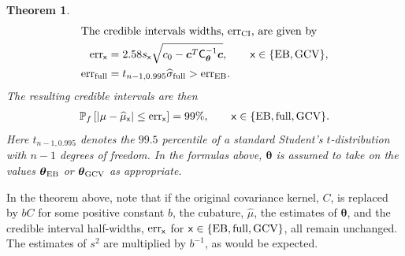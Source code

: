 \documentclass{iitthesis}          %
\newcommand{\bm}[1]{\boldsymbol{#1}}
\newcommand{\vtheta}{{\bm{\theta}}}
\newcommand{\vc}{\bm{c}}
\newcommand{\mCthetaInv}{{\mathsf{C}^{-1}_{\vtheta}}}
\newcommand{\hmu}{\widehat{\mu}}
\newcommand{\hsigma}{\widehat{\sigma}}
\newcommand{\MLE}{\textup{EB}}
\newcommand{\full}{\textup{full}}
\newcommand{\GCV}{\textup{GCV}}
\newcommand{\NICE}{\textup{nice}}
\newcommand{\err}{\textup{err}}
\newcommand{\JRNote}[1]{}
\newtheorem{theorem}{Theorem}[section]
\begin{document}
\begin{theorem}
\begin{align}
	\intertext{The credible intervals widths, $\err_{\textup{CI}}$, are given by}
	\label{eqn:err_MLEGCV}
	\err_{\mathsf{x}} & = 2.58 s_{\mathsf{x}} \sqrt{c_{0} - \vc^T\mCthetaInv\vc }, \qquad \mathsf{x} \in \{\MLE, \GCV\},  \\ 
	\err_{\textup{full}} 
	& = t_{n-1,0.995} \hsigma_{\textup{full}} > \err_\MLE. \label{FJH:eq:errFull}
	\end{align}
	The resulting credible intervals are then
	\begin{align}
	\label{eqn_prob_CI}
	\mathbb{P}_f \left[
	|\mu-\hmu_{\mathsf{x}}| \leq \err_{\mathsf{x}} \right]  = 99\%, \qquad \mathsf{x} \in \{\MLE, \full, \GCV\}.
	\end{align}
	Here $t_{n-1,0.995}$ denotes the $99.5$ percentile of a standard Student's $t$-distribution with $n-1$ degrees of freedom.  In the formulas above, $\vtheta$ is assumed to take on the values $\vtheta_{\MLE}$ or $\vtheta_{\GCV}$ as appropriate.
\end{theorem}

In the theorem above, note that if the original covariance kernel, $C$, is replaced by $b C$ for some positive constant $b$, the cubature, $\hmu$, the estimates of $\vtheta$, and the credible interval half-widths, $\err_{\mathsf{x}}$ for $\mathsf{x} \in \{\MLE, \full, \GCV\}$, all remain unchanged.  The estimates of $s^2$ are multiplied by $b^{-1}$, as would be expected. 




\label{sec:cone_of_functions}

\end{document}
